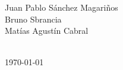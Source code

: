 \begin{titlepage}
\begin{minipage}[t]{.4\textwidth}
\begin{flushleft}
Juan Pablo Sánchez Magariños\\
Bruno Sbrancia\\
Matías Agustín Cabral
\end{flushleft}

\end{minipage}\hfill\begin{minipage}[t]{.4\textwidth}

\begin{flushright}

\end{flushright}
\end{minipage}
\\[1cm]

{\today}\\

\end{titlepage}

